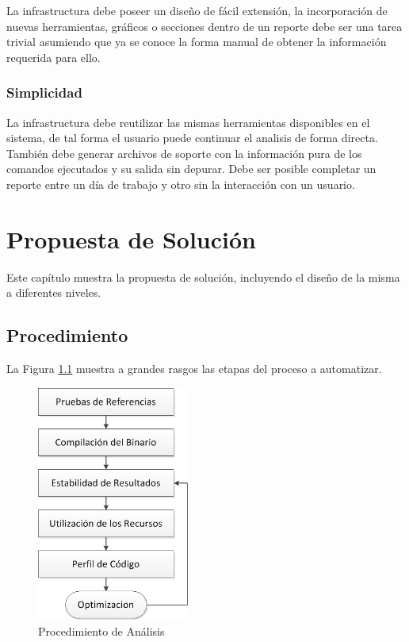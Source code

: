 \documentclass[a4paper]{report}
\begin{document}
La infrastructura debe poseer un diseño de fácil extensión, la incorporación de nuevas herramientas, gráficos o secciones dentro de un reporte debe ser una tarea trivial asumiendo que ya se conoce la forma manual de obtener la información requerida para ello.

\subsection{Simplicidad}

La infrastructura debe reutilizar las mismas herramientas disponibles en el sistema, de tal forma el usuario puede continuar el analisis de forma directa.
También debe generar archivos de soporte con la información pura de los comandos ejecutados y su salida sin depurar.
Debe ser posible completar un reporte entre un día de trabajo y otro sin la interacción con un usuario.

\chapter{Propuesta de Solución} \label{Propuesta de Solucion}

Este capítulo muestra la propuesta de solución, incluyendo el diseño de la misma a diferentes niveles.

\section{Procedimiento}

La Figura \ref{fig:procedure} muestra a grandes rasgos las etapas del proceso a automatizar.

\begin{figure}[H]
\label{fig:procedure}
\centering
\includegraphics[width=5cm]{procedure.png}
\caption{Procedimiento de Análisis}
\end{figure}
\end{document}
